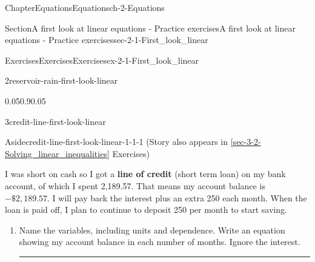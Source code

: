 \documentclass[twoside,11pt,]{book}
\newcommand{\xreffont}{\relax}
\newcommand{\terminology}[1]{\textbf{#1}}
\newlength{\workspacestrutwidth}
\numberwithin{equation}{section}
\newcommand{\amp}{&}
\begin{document}
\begin{chapterptx}{Chapter}{Equations}{}{Equations}{}{}{ch-2-Equations}
\begin{sectionptx}{Section}{A first look at linear equations - Practice exercises}{}{A first look at linear equations - Practice exercises}{}{}{sec-2-1-First_look_linear}
\begin{exercises-subsection-numberless}{Exercises}{Exercises}{}{Exercises}{}{}{ex-2-1-First_look_linear}
\begin{divisionexercise}{2}{}{}{reservoir-rain-first-look-linear}
\begin{enumerate}[label=(\alph*),ref=\alph*]
\begin{image}{0.05}{0.9}{0.05}{}
\end{image}%
\end{enumerate}%
\end{divisionexercise}%
\clearpage
\begin{divisionexercise}{3}{}{}{credit-line-first-look-linear}%
\begin{aside}{Aside}{}{credit-line-first-look-linear-1-1-1}%
(Story also appears in \hyperref[sec-3-2-Solving_linear_inequalities]{{\xreffont\ref{sec-3-2-Solving_linear_inequalities}}} Exercises)%
\end{aside}
 I was short on cash so I got a \terminology{line of credit} (short term loan) on my bank account, of which I spent \textdollar{}2,189.57. That means my account balance is \(-\$2{,}189.57\). I will pay back the interest plus an extra \textdollar{}250 each month. When the loan is paid off, I plan to continue to deposit \textdollar{}250 per month to start saving.%
\begin{enumerate}[label=(\alph*),ref=\alph*]%
\item{}Name the variables, including units and dependence. Write an equation showing my account balance in each number of months. Ignore the interest.%
\par
    \hspace{-2cm}
%
%
\par\rule{\workspacestrutwidth}{0.75cm}%

\end{enumerate}
\end{divisionexercise}
\end{exercises-subsection-numberless}
\end{sectionptx}
\end{chapterptx}
\end{document}
